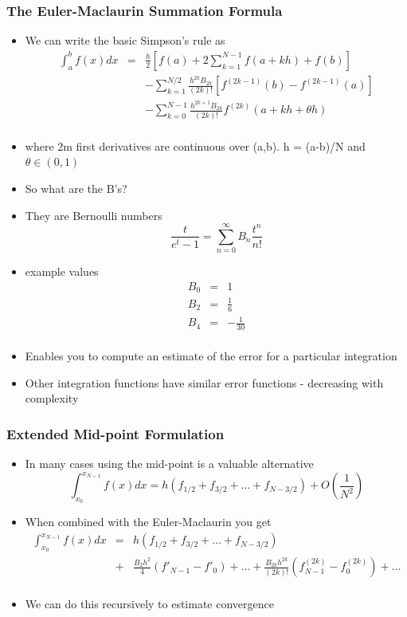 \documentclass[10pt]{beamer}
\begin{document}
\begin{frame}
  \frametitle{The Euler-Maclaurin Summation Formula}
  \begin{itemize}
  \item We can write the basic Simpson's rule as
    \[
      \begin{array}{rcl}
      \int_a^b f(x) dx &=& \frac{h}{2} \left[ f(a) + 2 \sum_{k=1}^{N-1} f (a + kh) + f(b) \right]\\
                       && - \sum_{k=1}^{N/2} \frac{h^{2k} B_{2k}}{(2k)!}[ f^{(2k-1)}(b) - f^{(2k-1)}(a)] \\
                       && - \sum_{k=0}^{N-1} \frac{h^{2k+1} B_{2k}}{(2k)!} f^{(2k)}(a + kh + \theta h) \\
      \end{array}
    \]
  \item where 2m first derivatives are continuous over (a,b). h = (a-b)/N and $\theta\in(0,1)$
  \item So what are the B's?
  \item They are Bernoulli numbers
    \[
      \frac{t}{e^t-1} = \sum_{n=0}^{\infty} B_n \frac{t^n}{n!}
    \]
  \item example values
    \[
      \begin{array}{rcl}
        B_0 & = & 1\\
        B_2 & = & \frac{1}{6} \\
        B_4 & = & - \frac{1}{30}\\
      \end{array}
    \]
  \item Enables you to compute an estimate of the error for a particular integration
  \item Other integration functions have similar error functions - decreasing with complexity
  \end{itemize}
\end{frame}

\begin{frame}
  \frametitle{Extended Mid-point Formulation}
  \begin{itemize}
  \item In many cases using the mid-point is a valuable alternative
    \[
      \int_{x_0}^{x_{N-1}} f(x) dx = h (f_{1/2} + f_{3/2} + \ldots + f_{N-3/2}) + O(\frac{1}{N^2})
    \]
  \item When combined with the Euler-Maclaurin you get
    \[
      \begin{array}{rcl}
        \int_{x_0}^{x_{N-1}} f(x) dx &=& h (f_{1/2} + f_{3/2} + \ldots + f_{N-3/2}) \\
                & + & \frac{B_2 h^2}{4} (f'_{N-1} - f'_0) + \ldots + \frac{B_{2k} h^{2k}}{(2k)!} (f^{(2k)}_{N-1} - f^{(2k)}_0) + \ldots \\
      \end{array}
    \]
  \item We can do this recursively to estimate convergence
  \end{itemize}
\end{frame}
\end{document}
